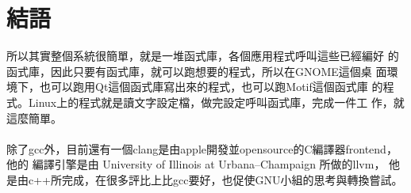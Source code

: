   \section{結語}
  所以其實整個系統很簡單，就是一堆函式庫，各個應用程式呼叫這些已經編好
  的函式庫，因此只要有函式庫，就可以跑想要的程式，所以在GNOME這個桌
  面環境下，也可以跑用Qt這個函式庫寫出來的程式，也可以跑Motif這個函式庫
  的程式。Linux上的程式就是讀文字設定檔，做完設定呼叫函式庫，完成一件工
  作，就這麼簡單。
  \\\\
  除了gcc外，目前還有一個clang是由apple開發並opensource的C編譯器frontend，他的
  編譯引擎是由 University of Illinois at Urbana–Champaign 所做的llvm，
  他是由c++所完成，在很多評比上比gcc要好，也促使GNU小組的思考與轉換嘗試。
